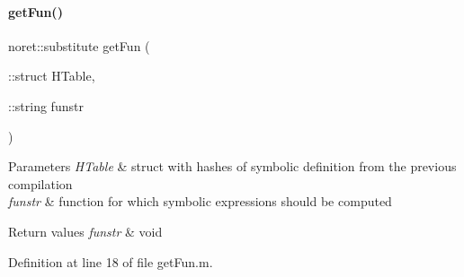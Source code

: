 \paragraph{\texorpdfstring{get\+Fun()}{getFun()}}
{\footnotesize\ttfamily noret\+::substitute get\+Fun (\begin{DoxyParamCaption}\item[{\+::struct}]{H\+Table,  }\item[{\+::string}]{funstr }\end{DoxyParamCaption})}


\begin{DoxyParams}{Parameters}
{\em H\+Table} & struct with hashes of symbolic definition from the previous compilation \\
\hline
{\em funstr} & function for which symbolic expressions should be computed\\
\hline
\end{DoxyParams}

\begin{DoxyRetVals}{Return values}
{\em funstr} & void \\
\hline
\end{DoxyRetVals}


Definition at line 18 of file get\+Fun.\+m.

